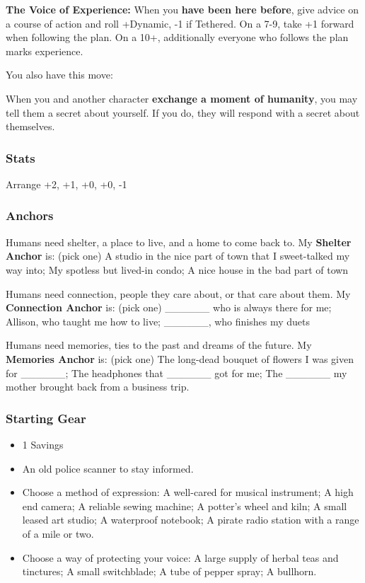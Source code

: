 \documentclass[
]{article}
\providecommand{\tightlist}{%
  \setlength{\itemsep}{0pt}\setlength{\parskip}{0pt}}
\begin{document}
\textbf{The Voice of Experience:} When you \textbf{have been here
before}, give advice on a course of action and roll +Dynamic, -1 if
Tethered. On a 7-9, take +1 forward when following the plan. On a 10+,
additionally everyone who follows the plan marks experience.

You also have this move:

When you and another character \textbf{exchange a moment of humanity},
you may tell them a secret about yourself. If you do, they will respond
with a secret about themselves.

\hypertarget{stats-8}{%
\subsubsection{Stats}\label{stats-8}}

Arrange +2, +1, +0, +0, -1

\hypertarget{anchors-7}{%
\subsubsection{Anchors}\label{anchors-7}}

Humans need shelter, a place to live, and a home to come back to. My
\textbf{Shelter Anchor} is: (pick one) A studio in the nice part of town
that I sweet-talked my way into; My spotless but lived-in condo; A nice
house in the bad part of town

Humans need connection, people they care about, or that care about them.
My \textbf{Connection Anchor} is: (pick one) \_\_\_\_\_\_ who is always
there for me; Allison, who taught me how to live; \_\_\_\_\_\_, who
finishes my duets

Humans need memories, ties to the past and dreams of the future. My
\textbf{Memories Anchor} is: (pick one) The long-dead bouquet of flowers
I was given for \_\_\_\_\_\_; The headphones that \_\_\_\_\_\_ got for
me; The \_\_\_\_\_\_ my mother brought back from a business trip.

\hypertarget{starting-gear-7}{%
\subsubsection{Starting Gear}\label{starting-gear-7}}

\begin{itemize}
\tightlist
\item
  1 Savings
\item
  An old police scanner to stay informed.
\item
  Choose a method of expression: A well-cared for musical instrument; A
  high end camera; A reliable sewing machine; A potter's wheel and kiln;
  A small leased art studio; A waterproof notebook; A pirate radio
  station with a range of a mile or two.
\item
  Choose a way of protecting your voice: A large supply of herbal teas
  and tinctures; A small switchblade; A tube of pepper spray; A
  bullhorn.
\end{itemize}
\end{document}
